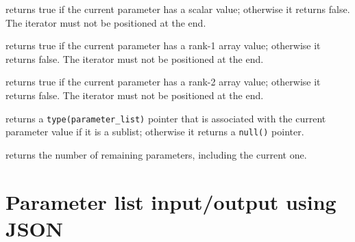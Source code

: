 \documentclass[11pt]{article}
\begin{document}
\begin{description}[style=nextline]
\item[\texttt{is_scalar()}]
  returns true if the current parameter has a scalar value; otherwise it
  returns false.  The iterator must not be positioned at the end.
\item[\texttt{is_vector()}]
  returns true if the current parameter has a rank-1 array value; otherwise it
  returns false.  The iterator must not be positioned at the end.
\item[\texttt{is_matrix()}]
  returns true if the current parameter has a rank-2 array value; otherwise it
  returns false.  The iterator must not be positioned at the end.
\item[\texttt{sublist()}]
  returns a \texttt{type(parameter_list)} pointer that is associated with
  the current parameter value if it is a sublist; otherwise it returns a
  \texttt{null()} pointer.
\item[\texttt{count()}]
  returns the number of remaining parameters, including the current one.
\end{description}

\section{Parameter list input/output using JSON}
\end{document}
